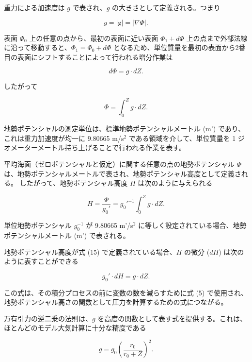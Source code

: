 \documentclass{article}
\begin{document}
重力による加速度は $g$ で表され、$g$ の大きさとして定義される。つまり

\begin{equation}
 g = |\text{g}| = |\nabla \Phi|. \tag{12}
\end{equation}

表面 $\Phi_0$ 上の任意の点から、最初の表面に近い表面 $\Phi_1+d\Phi$ 上の点まで外部法線に沿って移動すると、$\Phi_1 = \Phi_0 + d\Phi$ となるため、単位質量を最初の表面から2番目の表面にシフトすることによって行われる増分作業は

\begin{equation}
 d\Phi = g \cdot dZ. \tag{13}
\end{equation}

したがって

\begin{equation}
 \Phi = \int_{0}^{Z} g \cdot dZ . \tag{14}
\end{equation}

地勢ポテンシャルの測定単位は、標準地勢ポテンシャルメートル (m') であり、これは重力加速度が均一に 9.80665 m/s$^2$ である領域を介して、単位質量を 1 ジオメーターメートル持ち上げることで行われる作業を表す。

平均海面（ゼロポテンシャルと仮定）に関する任意の点の地勢ポテンシャル $\Phi$ は、地勢ポテンシャルメートルで表され、地勢ポテンシャル高度として定義される。
したがって、地勢ポテンシャル高度 $H$ は次のように与えられる

\begin{equation}
 H = \frac{\Phi}{g_0\text{$'$}} = g_0\text{$'$}^{-1} \int_{0}^{Z} g \cdot dZ. \tag{15}
\end{equation}

単位地勢ポテンシャル $g_0^{-1}$ が 9.80665 m'/s$^2$ に等しく設定されている場合、地勢ポテンシャルメートル (m') で表される。

地勢ポテンシャル高度が式 (15) で定義されている場合、$H$ の微分 ($dH$) は次のように表すことができる

\begin{equation}
  g_0\text{$'$}\cdot dH = g\cdot dZ. \tag{16}
\end{equation}

この式は、その積分プロセスの前に変数の数を減らすために式 (5) で使用され、地勢ポテンシャル高さの関数として圧力を計算するための式につながる。

万有引力の逆二乗の法則は、$g$ を高度の関数として表す式を提供する。これは、ほとんどのモデル大気計算に十分な精度である

\begin{equation}
 g = g_0 \left( \frac{r_0}{r_0 + Z} \right)^2. \tag{17}
\end{equation}
\end{document}
